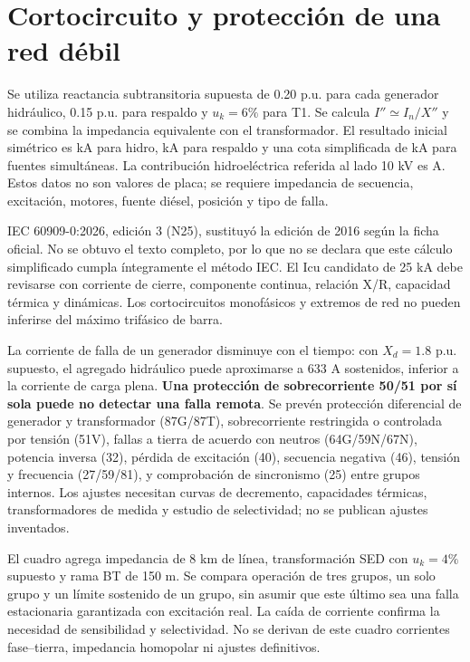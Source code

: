 \section{Cortocircuito y protección de una red débil}
Se utiliza reactancia subtransitoria supuesta de 0.20 p.u. para cada generador hidráulico, 0.15 p.u. para respaldo y \(u_k=6\%\) para T1. Se calcula \(I''\simeq I_n/X''\) y se combina la impedancia equivalente con el transformador. El resultado inicial simétrico es  kA para hidro,  kA para respaldo y una cota simplificada de  kA para fuentes simultáneas. La contribución hidroeléctrica referida al lado 10 kV es  A. Estos datos no son valores de placa; se requiere impedancia de secuencia, excitación, motores, fuente diésel, posición y tipo de falla.

IEC 60909-0:2026, edición 3 (N25), sustituyó la edición de 2016 según la ficha oficial. No se obtuvo el texto completo, por lo que no se declara que este cálculo simplificado cumpla íntegramente el método IEC. El Icu candidato de 25 kA debe revisarse con corriente de cierre, componente continua, relación X/R, capacidad térmica y dinámicas. Los cortocircuitos monofásicos y extremos de red no pueden inferirse del máximo trifásico de barra.

La corriente de falla de un generador disminuye con el tiempo: con \(X_d=1.8\) p.u. supuesto, el agregado hidráulico puede aproximarse a 633 A sostenidos, inferior a la corriente de carga plena. \textbf{Una protección de sobrecorriente 50/51 por sí sola puede no detectar una falla remota}. Se prevén protección diferencial de generador y transformador (87G/87T), sobrecorriente restringida o controlada por tensión (51V), fallas a tierra de acuerdo con neutros (64G/59N/67N), potencia inversa (32), pérdida de excitación (40), secuencia negativa (46), tensión y frecuencia (27/59/81), y comprobación de sincronismo (25) entre grupos internos. Los ajustes necesitan curvas de decremento, capacidades térmicas, transformadores de medida y estudio de selectividad; no se publican ajustes inventados.

El cuadro agrega impedancia de 8 km de línea, transformación SED con \(u_k=4\%\) supuesto y rama BT de 150 m. Se compara operación de tres grupos, un solo grupo y un límite sostenido de un grupo, sin asumir que este último sea una falla estacionaria garantizada con excitación real. La caída de corriente confirma la necesidad de sensibilidad y selectividad. No se derivan de este cuadro corrientes fase--tierra, impedancia homopolar ni ajustes definitivos.

